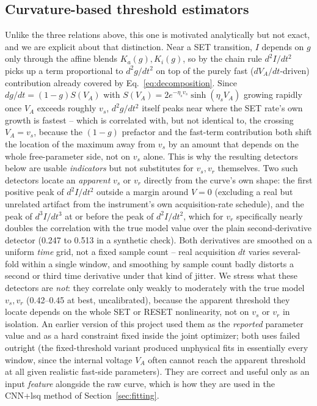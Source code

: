 \documentclass[11pt]{article}
\begin{document}
\subsection{Curvature-based threshold estimators}

Unlike the three relations above, this one is motivated analytically but
not exact, and we are explicit about that distinction. Near a SET
transition, $I$ depends on $g$ only through the affine blends $K_a(g),
K_i(g)$, so by the chain rule $d^2I/dt^2$ picks up a term proportional to
$d^2g/dt^2$ on top of the purely fast ($dV_A/dt$-driven) contribution
already covered by Eq.~\eqref{eq:decomposition}. Since
$dg/dt = (1-g)S(V_A)$ with $S(V_A) = 2e^{-\eta_s v_s}\sinh(\eta_s V_A)$
growing rapidly once $V_A$ exceeds roughly $v_s$, $d^2g/dt^2$ itself peaks
near where the SET rate's own growth is fastest -- which is correlated with,
but not identical to, the crossing $V_A = v_s$, because the $(1-g)$ prefactor
and the fast-term contribution both shift the location of the maximum away
from $v_s$ by an amount that depends on the whole free-parameter side, not
on $v_s$ alone. This is why the resulting detectors below are usable
\emph{indicators} but not substitutes for $v_s, v_r$ themselves. Two such
detectors locate an
\emph{apparent} $v_s$ or $v_r$ directly from the curve's own shape: the
first positive peak of $d^2I/dt^2$ outside a margin around $V=0$ (excluding
a real but unrelated artifact from the instrument's own acquisition-rate
schedule), and the peak of $d^3I/dt^3$ at or before the peak of $d^2I/dt^2$,
which for $v_r$ specifically nearly doubles the correlation with the true
model value over the plain second-derivative detector (0.247 to 0.513 in a
synthetic check). Both derivatives are smoothed on a uniform \emph{time}
grid, not a fixed sample count -- real acquisition $dt$ varies several-fold
within a single window, and smoothing by sample count badly distorts a
second or third time derivative under that kind of jitter. We stress what
these detectors are \emph{not}: they correlate only weakly to moderately
with the true model $v_s, v_r$ (0.42--0.45 at best, uncalibrated), because
the apparent threshold they locate depends on the whole SET or RESET
nonlinearity, not on $v_s$ or $v_r$ in isolation. An earlier version of this
project used them as the \emph{reported} parameter value and as a hard
constraint fixed inside the joint optimizer; both uses failed outright (the
fixed-threshold variant produced unphysical fits in essentially every
window, since the internal voltage $V_A$ often cannot reach the apparent
threshold at all given realistic fast-side parameters). They are correct
and useful only as an input \emph{feature} alongside the raw curve, which
is how they are used in the CNN+lsq method of Section~\ref{sec:fitting}.
\end{document}
